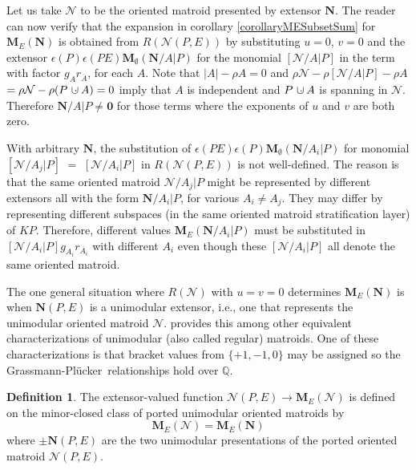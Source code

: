 \documentclass[12pt]{article}
\theoremstyle{definition}
\newtheorem{definition}[theorem]{Definition}
\newcommand{\dunion}
{\mbox{\hbox{\hskip6pt$\cdot$\hskip-5.50pt$\cup$\hskip2pt}}}
\newcommand{\scomp}[1]{\ensuremath{\overline{#1}}}
\newcommand{\FieldK}{\ensuremath{K}}
\newcommand{\Rank}{{\rho}}%
\newcommand{\Card}[1]{\ensuremath{{\left|#1\right|}}}
\newcommand{\ext}[1]{\ensuremath{\mathbf{#1}}}
\newcommand{\Plucker}{Pl\"{u}cker\ }
\begin{document}
Let us take $\mathcal{N}$ to be the oriented matroid
presented by extensor $\ext{N}$.
The reader can now verify that the expansion
in corollary \ref{corollaryMESubsetSum} 
for $\ext{M}_E(\ext{N})$
is obtained from
$R(\mathcal{N}(P,E))$ by substituting $u=0$, $v=0$ and the
extensor $\epsilon(P)\epsilon(PE)\ext{M}_\emptyset(\ext{N}/A|P)$
for the monomial $[\mathcal{N}/A|P]$ in the term with
factor $g_Ar_{\scomp{A}}$, for each $A$.  Note that 
$\Card{A}-\Rank{A}=0$ and 
$\Rank{\mathcal{N}}-\Rank{[\mathcal{N}/A|P]}-\Rank{A}$ 
$=\Rank{\mathcal{N}}-\Rank{(P\dunion A)} = 0$
imply that $A$ is independent and $P\dunion A$ is spanning
in $\mathcal{N}$. 
Therefore $\ext{N}/A|P\neq\ext{0}$ for those terms where
the exponents of $u$ and $v$ are both zero.

With arbitrary $\ext{N}$, the substitution
of $\epsilon(PE)\epsilon(P)\ext{M}_{\emptyset}(\ext{N}/A_i|P)$ for 
monomial $[\mathcal{N}/A_j|P]$ 
$=$ $[\mathcal{N}/A_i|P]$ 
in $R(\mathcal{N}(P,E))$ is not 
well-defined.  
The reason is that the same oriented matroid
$\mathcal{N}/A_j|P$ might be represented by different extensors all
with the form $\ext{N}/A_i|P$, for various $A_i\neq A_j$.  
They may differ by representing different subspaces 
(in the same oriented matroid stratification\cite[]{OMBOOK}
layer) of  $\FieldK P$.  
Therefore, different values $\ext{M}_E(\ext{N}/A_i|P)$ must be
substituted in $[\mathcal{N}/A_i|P]g_{A_i}r_{\scomp{A_i}}$ with
different $A_i$ even though these $[\mathcal{N}/A_i|P]$ all denote the same
oriented matroid.

The one general situation where $R(\mathcal{N})$ with $u=v=0$
determines $\ext{M}_E(\ext{N})$ is when $\ext{N}(P,E)$ is 
a unimodular extensor, i.e., one that represents the unimodular oriented 
matroid $\mathcal{N}$.  
\cite[Theorem 3.1.1, p. 41]{CombinatorialGeometries} 
provides this among other equivalent characterizations
of unimodular (also called regular) matroids.  
One of these characterizations is that
bracket values from $\{+1, -1, 0\}$ may be assigned so the 
Grassmann-\Plucker relationships hold over $\mathbb{Q}$.

\begin{definition}
\label{DefMUOM}
The extensor-valued function 
$\mathcal{N}(P,E)\rightarrow\ext{M}_E(\mathcal{N})$ is defined on the 
minor-closed class of ported unimodular oriented matroids by
\[
\ext{M}_E(\mathcal{N})=\ext{M}_E(\ext{N})
\]
where $\pm\ext{N}(P,E)$ are the two unimodular presentations of 
the ported oriented matroid $\mathcal{N}(P,E)$.
\end{definition}
\end{document}
